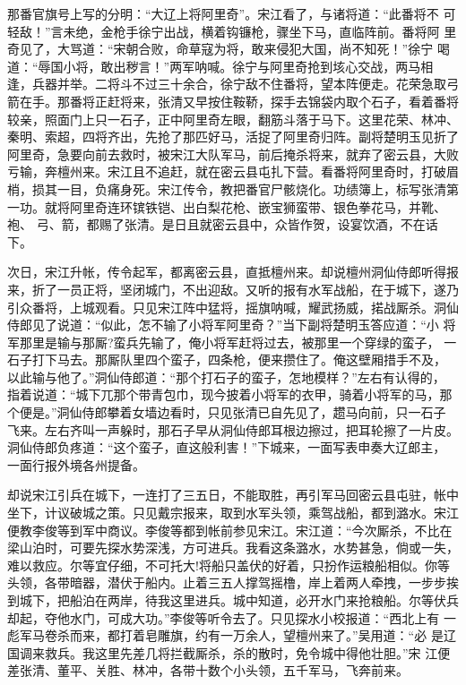 那番官旗号上写的分明：“大辽上将阿里奇”。宋江看了，与诸将道：“此番将不
可轻敌！”言未绝，金枪手徐宁出战，横着钩镰枪，骤坐下马，直临阵前。番将阿
里奇见了，大骂道：“宋朝合败，命草寇为将，敢来侵犯大国，尚不知死！”徐宁
喝道：“辱国小将，敢出秽言！”两军呐喊。徐宁与阿里奇抢到垓心交战，两马相
逢，兵器并举。二将斗不过三十余合，徐宁敌不住番将，望本阵便走。花荣急取弓
箭在手。那番将正赶将来，张清又早按住鞍鞒，探手去锦袋内取个石子，看着番将
较亲，照面门上只一石子，正中阿里奇左眼，翻筋斗落于马下。这里花荣、林冲、
秦明、索超，四将齐出，先抢了那匹好马，活捉了阿里奇归阵。副将楚明玉见折了
阿里奇，急要向前去救时，被宋江大队军马，前后掩杀将来，就弃了密云县，大败
亏输，奔檀州来。宋江且不追赶，就在密云县屯扎下营。看番将阿里奇时，打破眉
梢，损其一目，负痛身死。宋江传令，教把番官尸骸烧化。功绩簿上，标写张清第
一功。就将阿里奇连环镔铁铠、出白梨花枪、嵌宝狮蛮带、银色拳花马，并靴、袍、
弓、箭，都赐了张清。是日且就密云县中，众皆作贺，设宴饮酒，不在话下。

次日，宋江升帐，传令起军，都离密云县，直抵檀州来。却说檀州洞仙侍郎听得报
来，折了一员正将，坚闭城门，不出迎敌。又听的报有水军战船，在于城下，遂乃
引众番将，上城观看。只见宋江阵中猛将，摇旗呐喊，耀武扬威，掿战厮杀。洞仙
侍郎见了说道：“似此，怎不输了小将军阿里奇？”当下副将楚明玉答应道：“小
将军那里是输与那厮?蛮兵先输了，俺小将军赶将过去，被那里一个穿绿的蛮子，
一石子打下马去。那厮队里四个蛮子，四条枪，便来攒住了。俺这壁厢措手不及，
以此输与他了。”洞仙侍郎道：“那个打石子的蛮子，怎地模样？”左右有认得的，
指着说道：“城下兀那个带青包巾，现今披着小将军的衣甲，骑着小将军的马，那
个便是。”洞仙侍郎攀着女墙边看时，只见张清已自先见了，趱马向前，只一石子
飞来。左右齐叫一声躲时，那石子早从洞仙侍郎耳根边擦过，把耳轮擦了一片皮。
洞仙侍郎负疼道：“这个蛮子，直这般利害！”下城来，一面写表申奏大辽郎主，
一面行报外境各州提备。

却说宋江引兵在城下，一连打了三五日，不能取胜，再引军马回密云县屯驻，帐中
坐下，计议破城之策。只见戴宗报来，取到水军头领，乘驾战船，都到潞水。宋江
便教李俊等到军中商议。李俊等都到帐前参见宋江。宋江道：“今次厮杀，不比在
梁山泊时，可要先探水势深浅，方可进兵。我看这条潞水，水势甚急，倘或一失，
难以救应。尔等宜仔细，不可托大!将船只盖伏的好着，只扮作运粮船相似。你等
头领，各带暗器，潜伏于船内。止着三五人撑驾摇橹，岸上着两人牵拽，一步步挨
到城下，把船泊在两岸，待我这里进兵。城中知道，必开水门来抢粮船。尔等伏兵
却起，夺他水门，可成大功。”李俊等听令去了。只见探水小校报道：“西北上有
一彪军马卷杀而来，都打着皂雕旗，约有一万余人，望檀州来了。”吴用道：“必
是辽国调来救兵。我这里先差几将拦截厮杀，杀的散时，免令城中得他壮胆。”宋
江便差张清、董平、关胜、林冲，各带十数个小头领，五千军马，飞奔前来。

